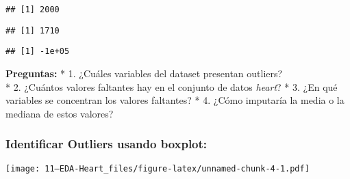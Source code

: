 \documentclass[
]{article}
\newenvironment{Shaded}{\begin{snugshade}}{\end{snugshade}}
\newcommand{\AttributeTok}[1]{\textcolor[rgb]{0.77,0.63,0.00}{#1}}
\newcommand{\CommentTok}[1]{\textcolor[rgb]{0.56,0.35,0.01}{\textit{#1}}}
\newcommand{\ConstantTok}[1]{\textcolor[rgb]{0.00,0.00,0.00}{#1}}
\newcommand{\FunctionTok}[1]{\textcolor[rgb]{0.00,0.00,0.00}{#1}}
\newcommand{\NormalTok}[1]{#1}
\newcommand{\OtherTok}[1]{\textcolor[rgb]{0.56,0.35,0.01}{#1}}
\newcommand{\SpecialCharTok}[1]{\textcolor[rgb]{0.00,0.00,0.00}{#1}}
\newcommand{\StringTok}[1]{\textcolor[rgb]{0.31,0.60,0.02}{#1}}
\begin{document}
\begin{verbatim}
## [1] 2000
\end{verbatim}

\begin{Shaded}
\end{Shaded}

\begin{verbatim}
## [1] 1710
\end{verbatim}

\begin{Shaded}
\end{Shaded}

\begin{verbatim}
## [1] -1e+05
\end{verbatim}

\textbf{Preguntas:} * 1. ¿Cuáles variables del dataset presentan
outliers?\\
* 2. ¿Cuántos valores faltantes hay en el conjunto de datos
\emph{heart}? * 3. ¿En qué variables se concentran los valores
faltantes? * 4. ¿Cómo imputaría la media o la mediana de estos valores?

\hypertarget{identificar-outliers-usando-boxplot}{%
\subsubsection{Identificar Outliers usando
boxplot:}\label{identificar-outliers-usando-boxplot}}

\begin{Shaded}
\end{Shaded}

\texttt{[image: 11--EDA-Heart\_files/figure-latex/unnamed-chunk-4-1.pdf]}

\begin{Shaded}
\end{Shaded}
\end{document}
